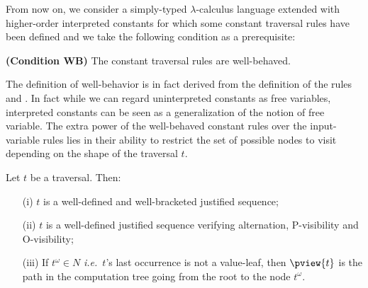 From now on, we consider a simply-typed $\lambda$-calculus language extended with
higher-order interpreted constants for which some constant traversal rules have been defined
and we take the following condition as a prerequisite:
\begin{center}
  \textbf{(Condition WB)} The constant traversal rules are well-behaved.
\end{center}


\begin{remark}
    The definition of well-behavior is in fact derived from the definition of the rules  and .  In fact while we can regard uninterpreted constants as free variables, interpreted constants can be seen as a generalization of the notion of free variable. The extra power of the well-behaved constant rules
    over the input-variable rules lies in their ability to restrict the set of possible nodes to visit depending on the shape of the traversal $t$.
\end{remark}


\bigskip

\begin{proposition}
\label{prop:pviewtrav_is_path}
Let $t$ be a traversal. Then:
\begin{itemize}
\item[(i)] $t$ is a well-defined and well-bracketed justified sequence;
\item[(ii)] $t$ is a well-defined justified sequence verifying alternation, P-visibility and O-visibility;
\item[(iii)] If $t^\omega \in N$ {\it i.e.}~$t$'s last occurrence is not a value-leaf, then $\pview{t}$ is the path in the computation tree going from the root to the node $t^\omega$.
\end{itemize}
\end{proposition}

